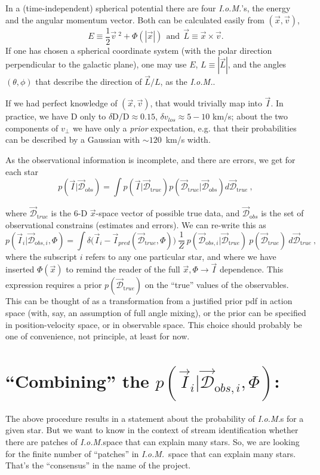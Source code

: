 \documentclass[12pt,a4paper,twoside]{article}
\newcommand{\D}{{\mathrm D}}
\newcommand{\dD}{\delta{\mathrm D}}
\newcommand{\vlos}{v_{los}}
\newcommand{\dvlos}{\delta\vlos}
\newcommand{\vperp}{v_\perp}
\newcommand{\vx}{\vec{x}}
\newcommand{\vv}{\vec{v}}
\newcommand{\xv}{(\vx,\vv)}
\newcommand{\vI}{\vec{I}}
\newcommand{\IoM}{{\sl I.o.M.}}
\newcommand{\vL}{\vec{L}}
\newcommand{\dtrue}{\vec{\mathcal D}_{\mathrm true}}
\newcommand{\dobs}{\vec{\mathcal D}_{\mathrm obs}}
\newcommand{\vIi}{\vec{I}_i}
\newcommand{\dobsi}{\vec{\mathcal D}_{{\mathrm obs},i}}
\begin{document}
In a (time-independent) spherical potential there are four \IoM 's, the energy and the angular momentum vector. Both can be calculated easily from $\xv$, 
$$E\equiv \frac{1}{2}\vv\ ^2+\Phi (|\vx |)\ \ {\mathrm{and}}\ \ \vL\equiv \vx \times \vv .$$
If one has chosen a spherical coordinate system (with the polar direction perpendicular to the galactic plane), one may use $E$, $L\equiv |\vL |$, and the angles $(\theta,\phi)$ that describe 
the direction of $\vL / L$, as the \IoM .

If we had perfect knowledge of $\xv$, that would trivially map into $\vI$. In practice, we have 
$\D$ only to $\dD / \D \approx 0.15$, $\dvlos \approx 5-10$ km/s; about the two components of $\vperp$ we have only a {\it prior} expectation, e.g. that their probabilities can be described by a Gaussian with $\sim 120$~km/s width.

As the observational information is incomplete, and there are errors, we get for each star
$$p(\vI | \dobs )={\displaystyle \int p(\vI | \dtrue) p(\dtrue | \dobs ) d \dtrue }\ ,$$

where $\dtrue$ is the 6-D $\vx$-space vector of possible true data, and $\dobs$ is the set 
of observational constrains (estimates and errors). We can re-write this as
$$p(\vIi | \dobsi,\Phi )={\displaystyle \int \delta \bigl( \vIi - \vI_{pred}(\dtrue,\Phi )\bigr ) 
\ \frac{1}{Z}\ p(\dobsi | \dtrue )\  p(\dtrue )\ d \dtrue }\ ,$$
where the subscript $i$ refers to any one particular star, and where we have inserted $\Phi (\vx)$
to remind the reader of the full $\vx ,\Phi \rightarrow \vI$ dependence.
This expression requires a prior $p(\dtrue)$ on the ``true'' values of the observables.
This can be thought of as a transformation from a justified prior pdf in action space
(with, say, an assumption of full angle mixing),
or the prior can be specified in position-velocity space, or in observable space.
This choice should probably be one of convenience, not principle, at least for now.

\section{``Combining'' the $p(\vIi | \dobsi,\Phi )$:}

The above procedure results in a statement about the probability of \IoM s for a given star.
But we want to know in the context of stream identification whether there are patches of \IoM space that can explain many stars.
So, we are looking for the finite number of ``patches'' in \IoM\ space that can explain many stars.
That's the ``consensus'' in the name of the project.
\end{document}

